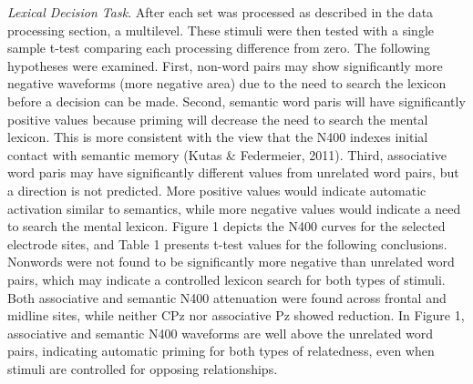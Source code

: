 \documentclass[english,man]{apa6}
\theoremstyle{definition}
\theoremstyle{definition}
\theoremstyle{definition}
\theoremstyle{remark}
\begin{document}
\emph{Lexical Decision Task}. After each set was processed as described
in the data processing section, a multilevel. These stimuli were then
tested with a single sample t-test comparing each processing difference
from zero. The following hypotheses were examined. First, non-word pairs
may show significantly more negative waveforms (more negative area) due
to the need to search the lexicon before a decision can be made. Second,
semantic word paris will have significantly positive values because
priming will decrease the need to search the mental lexicon. This is
more consistent with the view that the N400 indexes initial contact with
semantic memory (Kutas \& Federmeier, 2011). Third, associative word
paris may have significantly different values from unrelated word pairs,
but a direction is not predicted. More positive values would indicate
automatic activation similar to semantics, while more negative values
would indicate a need to search the mental lexicon. Figure 1 depicts the
N400 curves for the selected electrode sites, and Table 1 presents
t-test values for the following conclusions. Nonwords were not found to
be significantly more negative than unrelated word pairs, which may
indicate a controlled lexicon search for both types of stimuli. Both
associative and semantic N400 attenuation were found across frontal and
midline sites, while neither CPz nor associative Pz showed reduction. In
Figure 1, associative and semantic N400 waveforms are well above the
unrelated word pairs, indicating automatic priming for both types of
relatedness, even when stimuli are controlled for opposing
relationships.
\end{document}
